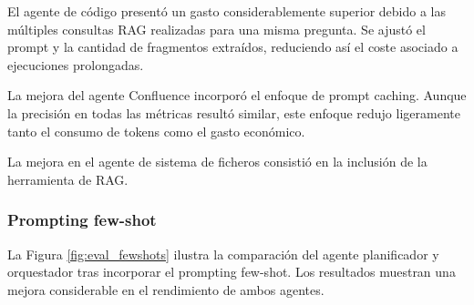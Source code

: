 El agente de código presentó un gasto considerablemente superior debido a las múltiples consultas RAG realizadas para una misma pregunta. Se ajustó el prompt y la cantidad de fragmentos extraídos, reduciendo así el coste asociado a ejecuciones prolongadas.

La mejora del agente Confluence incorporó el enfoque de prompt caching. Aunque la precisión en todas las métricas resultó similar, este enfoque redujo ligeramente tanto el consumo de tokens como el gasto económico.

La mejora en el agente de sistema de ficheros consistió en la inclusión de la herramienta de RAG.

\subsubsection{Prompting few-shot}
La Figura \ref{fig:eval_fewshots} ilustra la comparación del agente planificador y orquestador tras incorporar el prompting few-shot. Los resultados muestran una mejora considerable en el rendimiento de ambos agentes.


